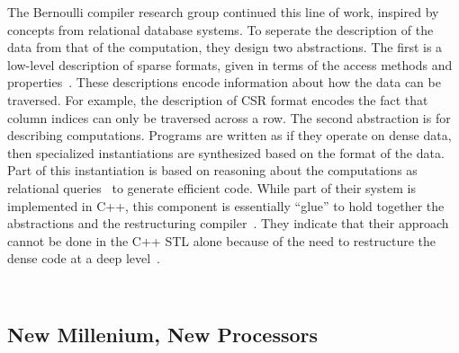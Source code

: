 The Bernoulli compiler research group continued this line of work, inspired by concepts from relational database systems. 
To seperate the description of the data from that of the computation, they design two abstractions.
The first is a low-level description of sparse formats, given in terms of the access methods and properties~\cite{kotlyar1997compiling}. 
These descriptions encode information about how the data can be traversed. 
For example, the description of CSR format encodes the fact that column indices can only be traversed across a row. 
The second abstraction is for describing computations.
Programs are written as if they operate on dense data, then specialized instantiations are synthesized based on the format of the data.
Part of this instantiation is based on reasoning about the computations as relational queries~\cite{kotlyar1997relational} to generate efficient code. 
While part of their system is implemented in C++, this component is essentially \enquote{glue} to hold together the abstractions and the restructuring compiler~\cite{mateev2000bernoulli}.
They indicate that their approach cannot be done in the C++ STL alone because of the need to restructure the dense code at a deep level~\cite{ahmed2000framework}.
\begin{figure}[h]
\begin{lstlisting}[caption={SpMV written using Bernoulli group representation.}]
  
\end{lstlisting}
\end{figure}
\cite{pugh1999sipr}
\cite{kessler1999sparamat}


\cite{koenker2003sparsem}




\subsection{New Millenium, New Processors}

\cite{bolz2003sparse}
\cite{bell2009implementing}
\cite{williams2007optimization}
\cite{baskaran2009optimizing}


